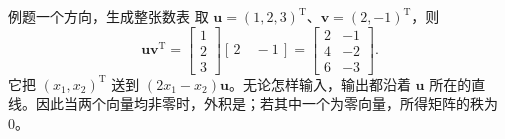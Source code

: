 \documentclass[a4paper,12pt,twoside,openany,fontset=none]{ctexbook}
\newcounter{example}[chapter]
\newenvironment{example}[1][]{\begin{exBox}{例题}{#1}}{\end{exBox}}
\numberwithin{equation}{chapter}
\begin{document}
\begin{example}[一个方向，生成整张数表]
取 $\boldsymbol u=(1,2,3)^{\mathrm T}$、$\boldsymbol v=(2,-1)^{\mathrm T}$，则
\[
 \boldsymbol u\boldsymbol v^{\mathrm T}
 =\begin{bmatrix}1\\2\\3\end{bmatrix}[\,2\quad-1\,]
 =\begin{bmatrix}2&-1\\4&-2\\6&-3\end{bmatrix}.
\]
它把 $(x_1,x_2)^{\mathrm T}$ 送到 $(2x_1-x_2)\boldsymbol u$。无论怎样输入，输出都沿着 $\boldsymbol u$ 所在的直线。因此当两个向量均非零时，外积是；若其中一个为零向量，所得矩阵的秩为0。
\end{example}
\end{document}
